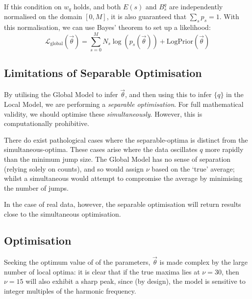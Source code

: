 \documentclass[fleqn,usenatbib]{mnras}
\begin{document}
{				If this condition on $w_q$ holds, and both $E(s)$ and $B_s^q$ are independently normalised on the domain $[0,M]$, it is also guaranteed that $\sum_s p_s = 1$. With this normalisation, we can use Bayes' theorem to set up a likelihood:
				\begin{equation}
					\mathcal{L}_\text{global}(\vec{\theta}) = \sum_{s=0}^M N_s \log\left({p}_s(\vec{\theta})\right) + \text{LogPrior}(\vec{\theta}) \label{E:BayesGlobal}
				\end{equation}
				
				
				\subsection{Limitations of Separable Optimisation}

					By utilising the Global Model to infer $\vec{\theta}$, and then using this to infer $\{q\}$ in the Local Model, we are performing a \textit{separable optimisation}. For full mathematical validity, we should optimise these \textit{simultaneously}. However, this is computationally prohibitive. 
					
					
					There do exist pathological cases where the separable-optima is distinct from the simultaneous-optima. These cases arise where the data oscillates $q$ more rapidly than the minimum jump size. The Global Model has no sense of separation (relying solely on counts), and so would assign $\nu$ based on the `true' average; whilst a simultaneous would attempt to compromise the average by minimising the number of jumps. 
					
					In the case of real data, however, the separable optimisation will return results close to the simultaneous optimisation.

			\subsection{Optimisation}

				Seeking the optimum value of of the parameters, $\vec{\theta}$ is made complex by the large number of local optima: it is clear that if the true maxima lies at $\nu = 30$, then $\nu=15$ will also exhibit a sharp peak, since (by design), the model is sensitive to integer multiples of the harmonic frequency. 
				
}
\end{document}
